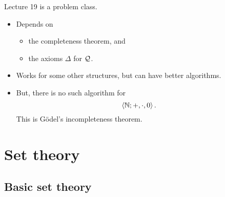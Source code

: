 
Lecture 19 is a problem class.


\begin{note*}
\hfill
\begin{itemize}
\item Depends on
\begin{itemize}
\item the completeness theorem, and
\item the axioms $ \Delta $ for $ \mathcal{Q} $.
\end{itemize}
\item Works for some other structures, but can have better algorithms.
\item But, there is no such algorithm for
$$ \left\langle \mathbb{N}; +, \cdot, 0 \right\rangle. $$
This is G\"odel's incompleteness theorem.
\end{itemize}
\end{note*}

\pagebreak

\section{Set theory}

\setcounter{subsection}{-1}

\subsection{Basic set theory}

